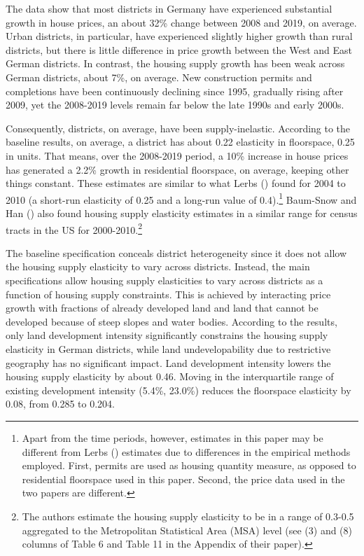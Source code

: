 \documentclass[
  12pt,
]{article}
\begin{document}
The data show that most districts in Germany have experienced substantial growth in house prices, an about 32\% change between 2008 and 2019, on average. Urban districts, in particular, have experienced slightly higher growth than rural districts, but there is little difference in price growth between the West and East German districts. In contrast, the housing supply growth has been weak across German districts, about 7\%, on average. New construction permits and completions have been continuously declining since 1995, gradually rising after 2009, yet the 2008-2019 levels remain far below the late 1990s and early 2000s.

Consequently, districts, on average, have been supply-inelastic. According to the baseline results, on average, a district has about 0.22 elasticity in floorspace, 0.25 in units. That means, over the 2008-2019 period, a 10\% increase in house prices has generated a 2.2\% growth in residential floorspace, on average, keeping other things constant. These estimates are similar to what Lerbs () found for 2004 to 2010 (a short-run elasticity of 0.25 and a long-run value of 0.4).\footnote{Apart from the time periods, however, estimates in this paper may be different from Lerbs () estimates due to differences in the empirical methods employed. First, permits are used as housing quantity measure, as opposed to residential floorspace used in this paper. Second, the price data used in the two papers are different.} Baum-Snow and Han () also found housing supply elasticity estimates in a similar range for census tracts in the US for 2000-2010.\footnote{The authors estimate the housing supply elasticity to be in a range of 0.3-0.5 aggregated to the Metropolitan Statistical Area (MSA) level (see (3) and (8) columns of Table 6 and Table 11 in the Appendix of their paper).}

The baseline specification conceals district heterogeneity since it does not allow the housing supply elasticity to vary across districts. Instead, the main specifications allow housing supply elasticities to vary across districts as a function of housing supply constraints. This is achieved by interacting price growth with fractions of already developed land and land that cannot be developed because of steep slopes and water bodies. According to the results, only land development intensity significantly constrains the housing supply elasticity in German districts, while land undevelopability due to restrictive geography has no significant impact. Land development intensity lowers the housing supply elasticity by about 0.46. Moving in the interquartile range of existing development intensity (5.4\%, 23.0\%) reduces the floorspace elasticity by 0.08, from 0.285 to 0.204.
\end{document}
